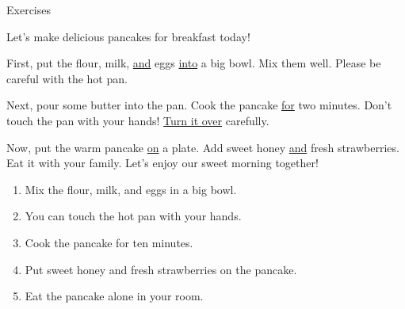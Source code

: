 \documentclass[aspectratio=169,xcolor={dvipsnames,table}]{beamer}
\begin{document}
\begin{frame}[plain,t]{Exercises}
  \hypertarget{READING}{}
  \vspace*{-4pt}
  \begin{tcolorbox}[colframe=ForestGreen,
      colback=NavyBlue!10!white,
      colbacktitle=NavyBlue!40!white,
      coltitle=black, %
      before upper={\setlength{\parindent}{1.25em}},
      title={Let's Make Pancakes\hfill{\tiny 0036}\quad{\scriptsize \myaudio{./audio/032_imperative_reading.mp3}}\,{\tiny reading}}
    ]
    \noindent{}Let's make delicious pancakes for breakfast today!

    First, put the flour, milk, \hyperlink{AND}{and} eggs \hyperlink{INTO}{into} a big bowl. Mix them well. Please be careful with the hot pan.

    Next, pour some butter into the pan. Cook the pancake \hyperlink{FOR}{for} two minutes. Don't touch the pan with your hands! \hyperlink{TURNOVER}{Turn it over} carefully.

    Now, put the warm pancake \hyperlink{ON}{on} a plate. Add sweet honey \hyperlink{AND2}{and} fresh strawberries. Eat it with your family. Let's enjoy our sweet morning together!
  \end{tcolorbox}

  \vspace{-4pt}
  \hfill\hyperlink{WORDS}{}

  \vspace{-11pt}
  \begin{enumerate}\setlength{\itemsep}{-3.2pt}
    \item<2-> Mix the flour, milk, and eggs in a big bowl.\hfill{}
    \item<2-> You can touch the hot pan with your hands.\hfill{}
    \item<2-> Cook the pancake for ten minutes.\hfill{}
    \item<2-> Put sweet honey and fresh strawberries on the pancake.\hfill{}
    \item<2-> Eat the pancake alone in your room.\hfill{}
  \end{enumerate}
\end{frame}
\end{document}
